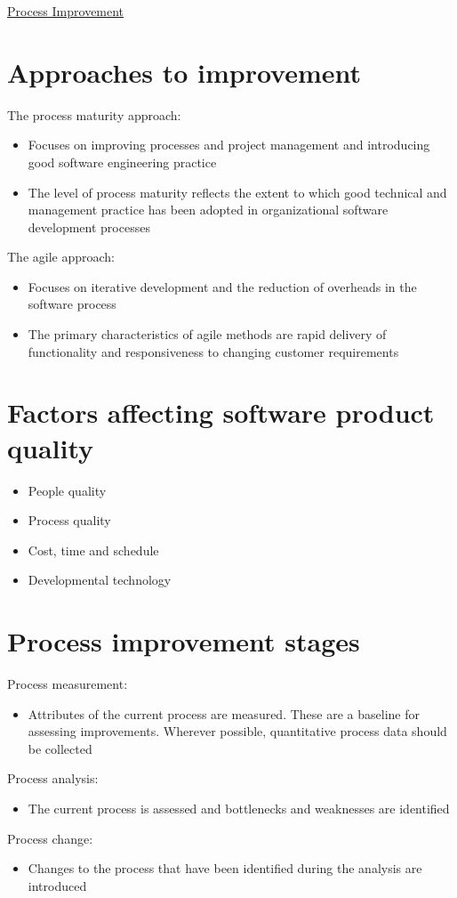\documentclass{article}[18pt]
\begin{document}
\begin{center}
\underline{\huge Process Improvement}
\end{center}
\section{Approaches to improvement}
The process maturity approach:
\begin{itemize}
	\item Focuses on improving processes and project management and introducing good software engineering practice
	\item The level of process maturity reflects the extent to which good technical and management practice has been adopted in organizational software development processes
\end{itemize}
The agile approach:
\begin{itemize}
	\item Focuses on iterative development and the reduction of overheads in the software process
	\item The primary characteristics of agile methods are rapid delivery of functionality and responsiveness to changing customer requirements
\end{itemize}
\section{Factors affecting software product quality}
\begin{itemize}
	\item People quality
	\item Process quality
	\item Cost, time and schedule
	\item Developmental technology
\end{itemize}
\section{Process improvement stages}
Process measurement:
\begin{itemize}
	\item Attributes of the current process are measured. These are a baseline for assessing improvements. Wherever possible, quantitative process data should be collected
\end{itemize}
Process analysis:
\begin{itemize}
	\item The current process is assessed and bottlenecks and weaknesses are identified
\end{itemize}
Process change:
\begin{itemize}
	\item Changes to the process that have been identified during the analysis are introduced
\end{itemize}
\end{document}
